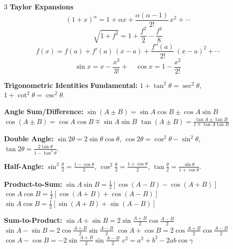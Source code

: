 \documentclass[1pt]{article}
\begin{document}
\begin{multicols}{3}
\textbf{Taylor Expansions}
\[
(1 + x)^\alpha = 1 + \alpha x + \frac{\alpha(\alpha-1)}{2!}\,x^2 + \cdots
\]
\[
\sqrt{1+f^2} = 1 + \frac{f^2}{2} - \frac{f^4}{8} 
\]
\[
f(x) = f(a) + f'(a)\,(x - a) + \frac{f''(a)}{2!}\,(x - a)^2 + \cdots
\]
\[
\sin x = x - \frac{x^3}{3!}+ \quad \cos x = 1 - \frac{x^2}{2!}
\]

\textbf{Trigonometric Identities}
\textbf{Fundamental:}  
$1 + \tan^2\theta = \sec^2\theta$, \quad  
$1 + \cot^2\theta = \csc^2\theta$.  

\textbf{Angle Sum/Difference:}  
$\sin(A\pm B) = \sin A\cos B \pm \cos A\sin B$  
$\cos(A\pm B) = \cos A\cos B \mp \sin A\sin B$  
$\tan(A\pm B) = \frac{\tan A \pm \tan B}{1 \mp \tan A\tan B}$  

\textbf{Double Angle:}  
$\sin 2\theta = 2\sin\theta\cos\theta$, \quad  
$\cos 2\theta = \cos^2\theta - \sin^2\theta$, \quad  
$\tan 2\theta = \frac{2\tan\theta}{1 - \tan^2\theta}$.  

\textbf{Half-Angle:}  
$\sin^2\frac{\theta}{2} = \frac{1 - \cos\theta}{2}$, \quad  
$\cos^2\frac{\theta}{2} = \frac{1 + \cos\theta}{2}$, \quad  
$\tan\frac{\theta}{2} = \frac{\sin\theta}{1+\cos\theta}$.  

\textbf{Product-to-Sum:}  
$\sin A\sin B = \frac{1}{2}[\cos(A-B) - \cos(A+B)]$  
$\cos A\cos B = \frac{1}{2}[\cos(A+B) + \cos(A-B)]$  
$\sin A\cos B = \frac{1}{2}[\sin(A+B) + \sin(A-B)]$  

\textbf{Sum-to-Product:}  
$\sin A + \sin B = 2\sin\frac{A+B}{2} \cos\frac{A-B}{2}$  
$\sin A - \sin B = 2\cos\frac{A+B}{2} \sin\frac{A-B}{2}$  
$\cos A + \cos B = 2\cos\frac{A+B}{2} \cos\frac{A-B}{2}$  
$\cos A - \cos B = -2\sin\frac{A+B}{2} \sin\frac{A-B}{2}$ 
$ c^{2}=a^{2}+b^{2}-2ab\cos\gamma $
\end{multicols}
\end{document}
